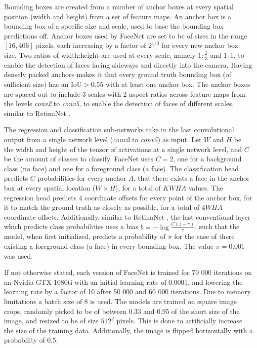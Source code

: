 \documentclass[a4paper, twoside]{article}
\begin{document}
Bounding boxes are created from a number of anchor boxes at every spatial position (width and height) from a set of feature maps. An anchor box is a bounding box of a specific size and scale, used to base the bounding box predictions off. Anchor boxes used by FaceNet are set to be of sizes in the range $[16, 406]$ pixels, each increasing by a factor of $2^{1/3}$ for every new anchor box size. Two ratios of width:height are used at every scale, namely $1:\frac{2}{3}$ and $1:1$, to enable the detection of faces facing sideways and directly into the camera. Having densely packed anchors makes it that every ground truth bounding box (of sufficient size) has an IoU$>0.55$ with at least one anchor box. The anchor boxes are spaced out to include 3 scales with 2 aspect ratios across feature maps from the levels \textit{conv2} to \textit{conv5}, to enable the detection of faces of different scales, similar to RetinaNet \cite{retinanet}.

The regression and classification sub-networks take in the last convolutional output from a single network level (\textit{conv2} to \textit{conv5}) as input. Let $W$ and $H$ be the width and height of the tensor of activations at a single network level, and $C$ be the amount of classes to classify. FaceNet uses $C=2$, one for a background class (no face) and one for a foreground class (a face). The classification head predicts $C$ probabilities for every anchor $A$, that there exists a face in the anchor box at every spatial location ($W \times H$), for a total of $KWHA$ values. The regression head predicts $4$ coordinate offsets for every point of the anchor box, for it to match the ground truth as closely as possible, for a total of $4WHA$ coordinate offsets. Additionally, similar to RetinaNet \cite{retinanet}, the last conventional layer which predicts class probabilities uses a bias $b = -\log{\frac{C(1-\pi)}{\pi}}$, such that the model, when first initialized, predicts a probability of $\pi$ for the case of there existing a foreground class (a face) in every bounding box. The value $\pi = 0.001$ was used.

If not otherwise stated, each version of FaceNet is trained for 70 000 iterations on an Nvidia GTX 1080ti with an initial learning rate of 0.0001, and lowering the learning rate by a factor of 10 after 50 000 and 60 000 iterations. Due to memory limitations a batch size of 8 is used. The models are trained on square image crops, randomly picked to be of between 0.33 and 0.95 of the short size of the image, and resized to be of size $512^2$ pixels. This is done to artificially increase the size of the training data. Additionally, the image is flipped horizontally with a probability of 0.5.
\end{document}
